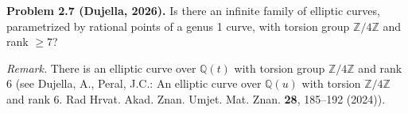 \textbf{Problem 2.7 (Dujella, 2026).} Is there an infinite family of elliptic curves, parametrized by rational points of a genus 1 curve, with torsion group $\mathbb{Z}/4\mathbb{Z}$ and rank $\geqslant 7$?

\medskip

\textit{Remark.} There is an elliptic curve over $\mathbb{Q}(t)$ with torsion group $\mathbb{Z}/4\mathbb{Z}$ and rank 6 (see Dujella, A., Peral, J.C.: An elliptic curve over $\mathbb{Q}(u)$ with torsion $\mathbb{Z}/4\mathbb{Z}$ and rank 6. Rad Hrvat. Akad. Znan. Umjet. Mat. Znan. \textbf{28}, 185--192 (2024)).
